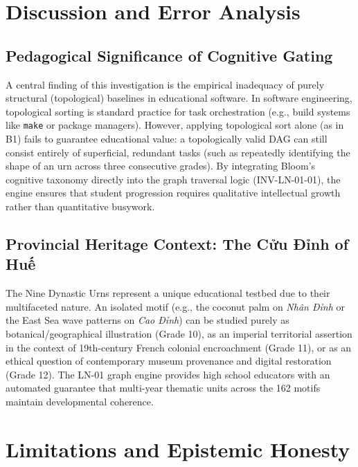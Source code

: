 \documentclass[11pt,a4paper]{article}
\begin{document}
\section{Discussion and Error Analysis}

\subsection{Pedagogical Significance of Cognitive Gating}

A central finding of this investigation is the empirical inadequacy of purely structural (topological) baselines in educational software. In software engineering, topological sorting is standard practice for task orchestration (e.g., build systems like \texttt{make} or package managers). However, applying topological sort alone (as in B1) fails to guarantee educational value: a topologically valid DAG can still consist entirely of superficial, redundant tasks (such as repeatedly identifying the shape of an urn across three consecutive grades). By integrating Bloom's cognitive taxonomy directly into the graph traversal logic (INV-LN-01-01), the engine ensures that student progression requires qualitative intellectual growth rather than quantitative busywork.

\subsection{Provincial Heritage Context: The Cửu Đỉnh of Huế}

The Nine Dynastic Urns represent a unique educational testbed due to their multifaceted nature. An isolated motif (e.g., the coconut palm on \textit{Nhân Đỉnh} or the East Sea wave patterns on \textit{Cao Đỉnh}) can be studied purely as botanical/geographical illustration (Grade 10), as an imperial territorial assertion in the context of 19th-century French colonial encroachment (Grade 11), or as an ethical question of contemporary museum provenance and digital restoration (Grade 12). The LN-01 graph engine provides high school educators with an automated guarantee that multi-year thematic units across the 162 motifs maintain developmental coherence.

\section{Limitations and Epistemic Honesty}
\end{document}
